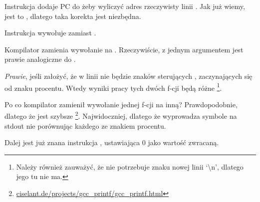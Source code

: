 Instrukcja  dodaje \ac{PC} do  żeby wyliczyć adres rzeczywisty linii . Jak już wiemy, jest to \q{\PICcode}, dlatego taka korekta jest niezbędna.

Instrukcja  wywołuje \puts zamiast \printf.

\label{puts}
Kompilator zamienia wywołanie \printf na \puts. 
Rzeczywiście, \printf z jednym argumentem jest prawie analogiczne do \puts.
 
\emph{Prawie}, jeśli założyć, że w linii nie będzie znaków sterujących \printf, 
zaczynających się od znaku procentu. Wtedy wyniki pracy tych dwóch f-cji będą różne
\footnote{Należy również zauważyć, że \puts nie potrzebuje znaku nowej linii `\textbackslash{}n',
dlatego jego tu nie ma.}.

Po co kompilator zamienił wywołanie jednej f-cji na inną? Prawdopodobnie, dlatego że \puts jest szybsze
\footnote{\href{http://go.yurichev.com/17063}{ciselant.de/projects/gcc\_printf/gcc\_printf.html}}. 
Najwidoczniej, dlatego że \puts wyprowadza symbole na \gls{stdout} nie porównując każdego ze znakiem procentu.

Dalej jest już znana instrukcja , ustawiająca 0 jako wartość zwracaną.


